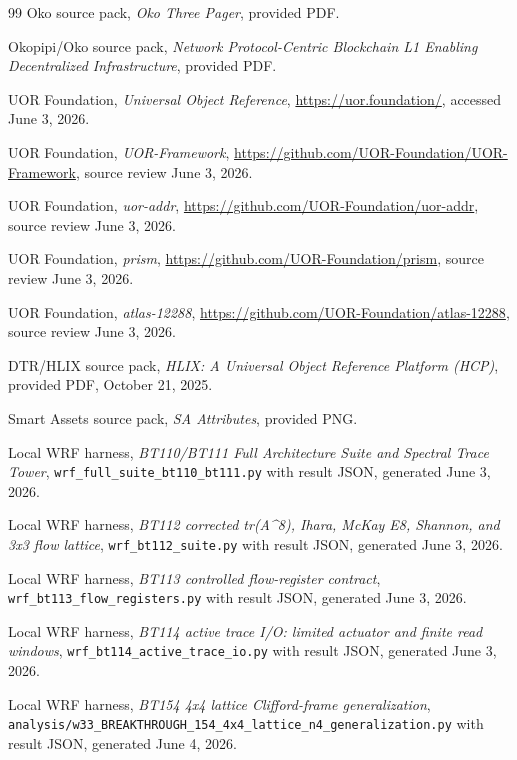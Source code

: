 \documentclass[11pt,letterpaper]{article}
\theoremstyle{remark}
\begin{document}
\begin{thebibliography}{99}
Oko source pack, \emph{Oko Three Pager}, provided PDF.

Okopipi/Oko source pack, \emph{Network Protocol-Centric Blockchain L1 Enabling
Decentralized Infrastructure}, provided PDF.

UOR Foundation, \emph{Universal Object Reference}, \url{https://uor.foundation/},
accessed June 3, 2026.

UOR Foundation, \emph{UOR-Framework}, \url{https://github.com/UOR-Foundation/UOR-Framework},
source review June 3, 2026.

UOR Foundation, \emph{uor-addr}, \url{https://github.com/UOR-Foundation/uor-addr},
source review June 3, 2026.

UOR Foundation, \emph{prism}, \url{https://github.com/UOR-Foundation/prism},
source review June 3, 2026.

UOR Foundation, \emph{atlas-12288}, \url{https://github.com/UOR-Foundation/atlas-12288},
source review June 3, 2026.

DTR/HLIX source pack, \emph{HLIX: A Universal Object Reference Platform (HCP)},
provided PDF, October 21, 2025.

Smart Assets source pack, \emph{SA Attributes}, provided PNG.

Local WRF harness, \emph{BT110/BT111 Full Architecture Suite and Spectral Trace Tower},
\texttt{wrf\_full\_suite\_bt110\_bt111.py} with result JSON, generated June 3, 2026.

Local WRF harness, \emph{BT112 corrected tr(A\^{}8), Ihara, McKay E8, Shannon, and 3x3 flow lattice},
\texttt{wrf\_bt112\_suite.py} with result JSON, generated June 3, 2026.

Local WRF harness, \emph{BT113 controlled flow-register contract},
\texttt{wrf\_bt113\_flow\_registers.py} with result JSON, generated June 3, 2026.

Local WRF harness, \emph{BT114 active trace I/O: limited actuator and finite read windows},
\texttt{wrf\_bt114\_active\_trace\_io.py} with result JSON, generated June 3, 2026.

Local WRF harness, \emph{BT154 4x4 lattice Clifford-frame generalization},
\texttt{analysis/w33\_BREAKTHROUGH\_154\_4x4\_lattice\_n4\_generalization.py}
with result JSON, generated June 4, 2026.


\end{thebibliography}
\end{document}
